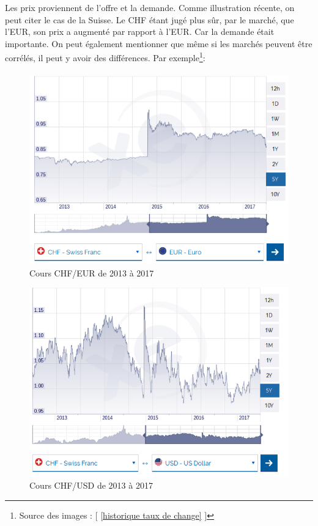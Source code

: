 \documentclass[a4paper, 11pt]{article}
\begin{document}
Les prix proviennent de l'offre et la demande. Comme illustration récente, on peut citer le cas de la Suisse. Le CHF étant jugé plus sûr, par le marché, que l'EUR, son prix a augmenté par rapport à l'EUR. Car la demande était importante. On peut également mentionner que même si les marchés peuvent être corrélés, il peut y avoir des différences. Par exemple\footnote{Source des images : $[$ \ref{historique taux de change} $]$}: \paragraph{}
\newpage
\begin{figure}[!htb]
\centering
\includegraphics[scale=0.35]{images/chf_eur_5ans}
\caption{Cours CHF/EUR de 2013 à 2017}
\end{figure}

\begin{figure}[!htb]
\centering
\includegraphics[scale=0.35]{images/chf_usd_5ans}
\caption{Cours CHF/USD de 2013 à 2017}
\end{figure}
\end{document}
